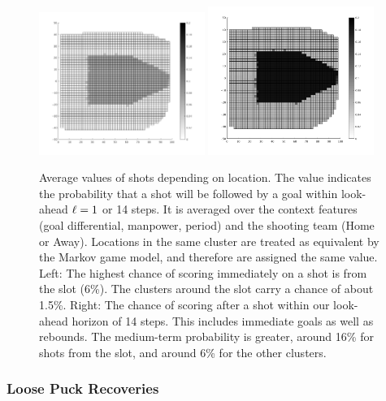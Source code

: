 \begin{figure}
\centering 
\includegraphics[width=0.48\textwidth]{shot2d.png}
\includegraphics[width=0.48\textwidth]{shotvalue3d.png}
\caption{Average values of shots depending on location. The value indicates the probability that a shot will be followed by a goal within look-ahead $\ell = 1$ or 14 steps. It is averaged over the context features (goal differential, manpower, period) and the shooting team (Home or Away). Locations in the same cluster are treated as equivalent by the Markov game model, and therefore are assigned the same value. Left: The highest chance of scoring immediately on a shot is from the slot (6\%). The clusters around the slot carry a chance of about 1.5\%. Right: The chance of scoring after a shot within our look-ahead horizon of 14 steps. This includes immediate goals as well as rebounds. The medium-term probability is greater, around 16\% for shots from the slot, and around 6\% for the other clusters.}
\label{fig:shot-values}
\end{figure}

\subsubsection{Loose Puck Recoveries} 

